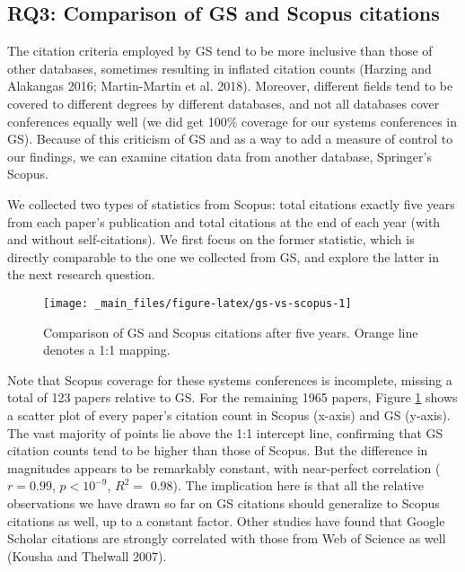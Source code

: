 \documentclass{article}
\begin{document}
\hypertarget{rq3-comparison-of-gs-and-scopus-citations}{%
\subsection{RQ3: Comparison of GS and Scopus citations}\label{rq3-comparison-of-gs-and-scopus-citations}}

The citation criteria employed by GS tend to be more inclusive than those of other databases, sometimes resulting in inflated citation counts (Harzing and Alakangas 2016; Martin-Martin et al. 2018).
Moreover, different fields tend to be covered to different degrees by different databases, and not all databases cover conferences equally well (we did get 100\% coverage for our systems conferences in GS).
Because of this criticism of GS and as a way to add a measure of control to our findings, we can examine citation data from another database, Springer's Scopus.

We collected two types of statistics from Scopus: total citations exactly five years from each paper's publication and total citations at the end of each year (with and without self-citations).
We first focus on the former statistic, which is directly comparable to the one we collected from GS, and
explore the latter in the next research question.

\begin{figure}
\texttt{[image: \_main\_files/figure-latex/gs-vs-scopus-1]} \caption{Comparison of GS and Scopus citations after five years. Orange line denotes a 1:1 mapping.}\label{fig:gs-vs-scopus}
\end{figure}

Note that Scopus coverage for these systems conferences is incomplete, missing a total of 123 papers relative to GS.
For the remaining 1965 papers, Figure \ref{fig:gs-vs-scopus} shows a scatter plot of every paper's citation count in Scopus (x-axis) and GS (y-axis).
The vast majority of points lie above the 1:1 intercept line, confirming that GS citation counts tend to be higher than those of Scopus.
But the difference in magnitudes appears to be remarkably constant, with near-perfect correlation
(\(r=0.99\), \(p<10^{-9}\), \(R^{2}=\) 0.98).
The implication here is that all the relative observations we have drawn so far on GS citations should generalize to Scopus citations as well, up to a constant factor.
Other studies have found that Google Scholar citations are strongly correlated with those from Web of Science as well (Kousha and Thelwall 2007).
\end{document}
